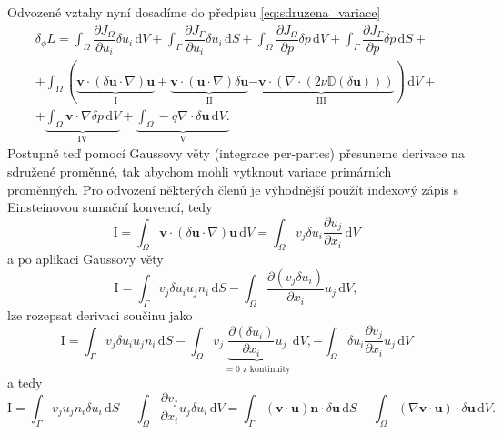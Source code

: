 Odvozené vztahy nyní dosadíme do předpisu \ref{eq:sdruzena_variace}
\begin{multline}
\delta_\phi L = 
\int_{\Omega} \dfrac{\partial J_{\Omega}}{\partial u_i} \delta u_i \, \mathrm{d}V 
+ 
\int_{\Gamma} \dfrac{\partial J_{\Gamma}}{\partial u_i} \delta u_i \, \mathrm{d}S
+
\int_{\Omega} \dfrac{\partial J_{\Omega}}{\partial p} \delta p  \, \mathrm{d}V 
+ 
\int_{\Gamma} \dfrac{\partial J_{\Gamma}}{\partial p} \delta p  \, \mathrm{d}S
+\\+
\int_{\Omega} 
		\left(
		\underbrace{\mathbf{v} \cdot(\delta \mathbf{u}\cdot \nabla )\mathbf{u}}_\mathrm{I}
		+ \underbrace{\mathbf{v} \cdot(\mathbf{u}\cdot \nabla )\delta\mathbf{u}}_\mathrm{II}
		\underbrace{ - \mathbf{v} \cdot (\nabla \cdot (2\nu \mathbb{D}(\delta \mathbf{u}) ))}_\mathrm{III}
		\right)
\, \mathrm{d}V
+\\+
\underbrace{
\int_{\Omega} 
 \mathbf{v} \cdot \nabla \delta p
\, \mathrm{d}V
}_\mathrm{IV}
+
\underbrace{
\int_{\Omega} 
  - q \nabla \cdot \delta \mathbf{u}
\, \mathrm{d}V.
}_\mathrm{V} 
\end{multline}
Postupně teď pomocí Gaussovy věty (integrace per-partes) přesuneme derivace na sdružené proměnné, tak abychom mohli vytknout variace primárních proměnných. Pro odvození některých členů je výhodnější použít indexový zápis s Einsteinovou sumační konvencí, tedy
\begin{equation*}
\mathrm{I}
=
\int_{\Omega} 
\mathbf{v}\cdot(\delta\mathbf{u}\cdot \nabla)\mathbf{u}
\, \mathrm{d}V
=
\int_{\Omega} 
v_j \delta u_i \frac{\partial u_j}{\partial x_i}
\, \mathrm{d}V
\end{equation*}
a po aplikaci Gaussovy věty
\begin{equation*}
\mathrm{I}
=
\int_{\Gamma} 
v_j \delta u_i u_j n_i
\, \mathrm{d}S
-
\int_{\Omega} 
\frac{\partial( v_j \delta u_i )}{\partial x_i}u_j
\, \mathrm{d}V,
\end{equation*}
lze rozepsat derivaci součinu jako
\begin{equation*}
\mathrm{I}
=
\int_{\Gamma} 
v_j \delta u_i u_j n_i
\, \mathrm{d}S
-
\int_{\Omega} 
v_j\underbrace{\frac{\partial( \delta u_i )}{\partial x_i}u_j}_{=0 \text{ z kontinuity} }
\, \mathrm{d}V,
-
\int_{\Omega} 
\delta u_i \frac{\partial v_j  }{\partial x_i}u_j
\, \mathrm{d}V
\end{equation*} 
a tedy
\begin{equation}\label{eq:clen_I}
\mathrm{I}
=
\int_{\Gamma} 
v_j u_j n_i \delta u_i 
\, \mathrm{d}S
-
\int_{\Omega} 
\frac{\partial v_j  }{\partial x_i} u_j \delta u_i
\, \mathrm{d}V
=
\int_{\Gamma} 
(\mathbf{v}\cdot \mathbf{u} )\mathbf{n} \cdot \delta\mathbf{u}
\, \mathrm{d}S
-
\int_{\Omega} 
(\nabla \mathbf{v}\cdot \mathbf{u})\cdot\delta \mathbf{u}
\, \mathrm{d}V.
\end{equation}
